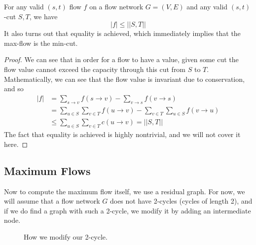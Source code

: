   \begin{theorem}
    For any valid $(s, t)$ flow $f$ on a flow network $G = (V, E)$ and any valid $(s, t)$-cut $S, T$, we have 
    \begin{equation}
      |f| \leq ||S, T||
    \end{equation} 
    It also turns out that equality is achieved, which immediately implies that the max-flow is the min-cut. 
  \end{theorem}
  \begin{proof}
    We can see that in order for a flow to have a value, given some cut the flow value cannot exceed the capacity through this cut from $S$ to $T$. Mathematically, we can see that the flow value is invariant due to conservation, and so  
    \begin{align}
      |f| & = \sum_{s \rightarrow v} f(s \rightarrow v) - \sum_{v \rightarrow s} f(v \rightarrow s) \\ 
          & = \sum_{u \in S} \sum_{v \in T} f(u \rightarrow v) - \sum_{v \in T} \sum_{u \in S} f(v \rightarrow u) \\ 
          & \leq \sum_{u \in S} \sum_{v \in T} c(u \rightarrow v) = ||S, T||
    \end{align}
    The fact that equality is achieved is highly nontrivial, and we will not cover it here. 
  \end{proof} 

\subsection{Maximum Flows}  

  Now to compute the maximum flow itself, we use a residual graph. For now, we will assume that a flow network $G$ does not have 2-cycles (cycles of length 2), and if we do find a graph with such a 2-cycle, we modify it by adding an intermediate node. 

  \begin{figure}[H]
    \centering 
    \caption{How we modify our 2-cycle.} 
    \label{fig:cycle_mod}
  \end{figure}

